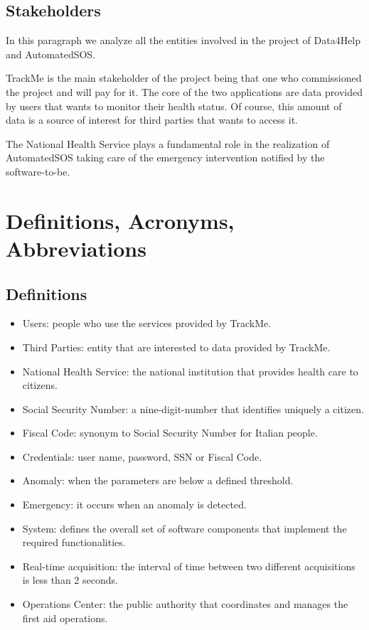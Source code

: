 \subsection{Stakeholders}
In this paragraph we analyze all the entities involved in the project of Data4Help and AutomatedSOS.
\par TrackMe is the main stakeholder of the project being that one who commissioned the project and will pay for it.
The core of the two applications are data provided by users that wants to monitor their health status.
Of course, this amount of data is a source of interest for third parties that wants to access it.
\par The National Health Service plays a fundamental role in the realization of AutomatedSOS taking care of the emergency intervention notified by the software-to-be.

\section{Definitions, Acronyms, Abbreviations}
\subsection{Definitions}
\begin{itemize}
    \item Users: people who use the services provided by TrackMe.
    \item Third Parties: entity that are interested to data provided by TrackMe.
    \item National Health Service: the national institution that provides health care to citizens.
    \item Social Security Number: a nine-digit-number that identifies uniquely a citizen.
    \item Fiscal Code: synonym to Social Security Number for Italian people.
    \item Credentials: user name, password, SSN or Fiscal Code.
    \item Anomaly: when the parameters are below a defined threshold. 
    \item Emergency: it occurs when an anomaly is detected.
    \item System: defines the overall set of software components that implement the required functionalities.
    \item Real-time acquisition: the interval of time between two different acquisitions is less than 2 seconds.
    \item Operations Center: the public authority that coordinates and manages the first aid operations.
\end{itemize}

